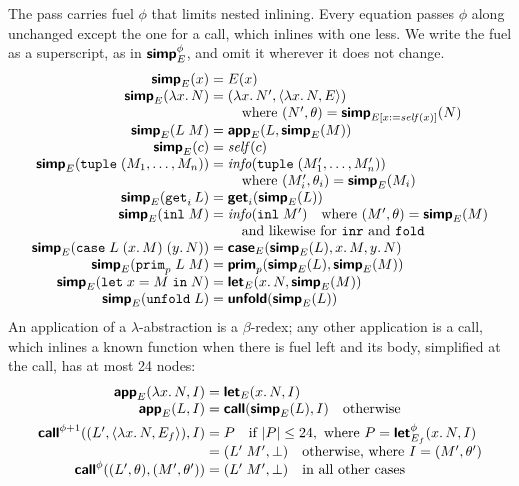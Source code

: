 The pass carries fuel $\phi$ that limits nested inlining. Every
equation passes $\phi$ along unchanged except the one for a call,
which inlines with one less. We write the fuel as a superscript, as in
$\textsf{\bfseries simp}^{\phi}_E$, and omit it wherever it does not change.
\[
\begin{array}{@{}r@{\;}c@{\;}l@{}}
  \pass{simp}_E(x) & = & E(x)\\
  \pass{simp}_E(\lambda x.\, N) & = &
    (\lambda x.\, N', \langle \lambda x.\, N, E \rangle)\\
  & & \quad \text{where } (N', \theta) = \pass{simp}_{E[x:=\mathit{self}(x)]}(N)\\
  \pass{simp}_E(L\;M) & = & \pass{app}_E(L, \pass{simp}_E(M))\\
  \pass{simp}_E(c) & = & \mathit{self}(c)\\
  \pass{simp}_E(\kw{tuple}\;(M_1, \ldots, M_n)) & = &
    \mathit{info}(\kw{tuple}\;(M'_1, \ldots, M'_n))\\
  & & \quad \text{where } (M'_i, \theta_i) = \pass{simp}_E(M_i)\\
  \pass{simp}_E(\kw{get}_i\,L) & = & \pass{get}_i(\pass{simp}_E(L))\\
  \pass{simp}_E(\kw{inl}\;M) & = & \mathit{info}(\kw{inl}\;M')
    \quad \text{where } (M', \theta) = \pass{simp}_E(M)\\
  & & \quad \text{and likewise for } \kw{inr} \text{ and } \kw{fold}\\
  \pass{simp}_E(\kw{case}\;L\;(x.\,M)\;(y.\,N)) & = &
    \pass{case}_E(\pass{simp}_E(L), x.\,M, y.\,N)\\
  \pass{simp}_E(\kw{prim}_p\;L\;M) & = & \pass{prim}_p(\pass{simp}_E(L), \pass{simp}_E(M))\\
  \pass{simp}_E(\kw{let}\;x = M\;\kw{in}\;N) & = & \pass{let}_E(x.\,N, \pass{simp}_E(M))\\
  \pass{simp}_E(\kw{unfold}\;L) & = & \pass{unfold}(\pass{simp}_E(L))
\end{array}
\]
An application of a $\lambda$-abstraction is a $\beta$-redex; any other
application is a call, which inlines a known function when there is
fuel left and its body, simplified at the call, has at most 24 nodes:
\[
\begin{array}{@{}r@{\;}c@{\;}l@{}}
  \pass{app}_E(\lambda x.\, N, I) & = & \pass{let}_E(x.\,N, I)\\
  \pass{app}_E(L, I) & = & \pass{call}(\pass{simp}_E(L), I)
    \quad \text{otherwise}\\[4pt]
  \pass{call}^{\phi+1}((L', \langle \lambda x.\, N, E_f \rangle), I) & = & P
    \quad \text{if } |P| \leq 24, \text{ where } P = \pass{let}^{\phi}_{E_f}(x.\,N, I)\\
  & = & (L'\;M', \bot)
    \quad \text{otherwise, where } I = (M', \theta')\\
  \pass{call}^{\phi}((L', \theta), (M', \theta')) & = & (L'\;M', \bot)
    \quad \text{in all other cases}
\end{array}
\]

